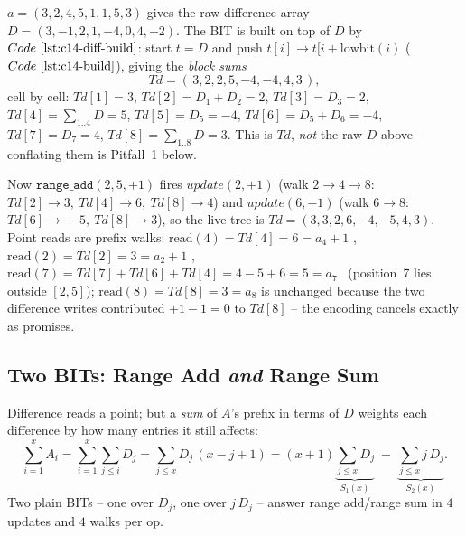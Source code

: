 \begin{tracebox}
\(a=(3,2,4,5,1,1,5,3)\) gives the raw difference array
\(D=(3,-1,2,1,-4,0,4,-2)\).  The BIT is built on top of \(D\) by
\(\coderef{c14-diff-build}\): start \(t=D\) and push \(t[i]\to t[i{+}\text{lowbit}(i)\)
(\(\coderef{c14-build}\)), giving the \emph{block sums}
\[
  Td=(\,3,2,2,5,-4,-4,4,3\,),
\]
cell by cell: \(Td[1]=3\), \(Td[2]=D_1{+}D_2=2\), \(Td[3]=D_3=2\),
\(Td[4]=\sum_{1..4}D=5\), \(Td[5]=D_5=-4\), \(Td[6]=D_5{+}D_6=-4\),
\(Td[7]=D_7=4\), \(Td[8]=\sum_{1..8}D=3\).  This is \(Td\), \emph{not} the
raw \(D\) above -- conflating them is Pitfall~1 below.

Now \(\texttt{range\_add}(2,5,+1)\) fires \(\mathit{update}(2,+1)\) (walk
\(2{\to}4{\to}8\): \(Td[2]\!{\to}\!3,\ Td[4]\!{\to}\!6,\ Td[8]\!{\to}\!4\)) and
\(\mathit{update}(6,-1)\) (walk \(6{\to}8\): \(Td[6]\!{\to}\!-5,\ Td[8]\!{\to}\!3\)),
so the live tree is \(Td=(3,3,2,6,-4,-5,4,3)\).  Point reads are prefix walks:
\(\text{read}(4)=Td[4]=6=a_4{+}1\) \checkmark,\quad
\(\text{read}(2)=Td[2]=3=a_2{+}1\) \checkmark,\quad
\(\text{read}(7)=Td[7]{+}Td[6]{+}Td[4]=4-5+6=5=a_7\) \checkmark\ (position~7
lies outside \([2,5]\)); \(\text{read}(8)=Td[8]=3=a_8\) is unchanged because
the two difference writes contributed \(+1-1=0\) to \(Td[8]\) -- the encoding
cancels exactly as  promises.
\end{tracebox}

\subsection{Two BITs: Range Add \emph{and} Range Sum}

Difference reads a point; but a \emph{sum} of \(A\)'s prefix in terms of
\(D\) weights each difference by how many entries it still affects:
\[
  \sum_{i=1}^{x} A_i
  = \sum_{i=1}^{x}\sum_{j\le i} D_j
  = \sum_{j\le x} D_j\,(x-j+1)
  = (x+1)\underbrace{\sum_{j\le x} D_j}_{S_1(x)}
    \;-\; \underbrace{\sum_{j\le x} j\,D_j}_{S_2(x)} .
\]
Two plain BITs -- one over \(D_j\), one over \(j\,D_j\) -- answer range
add/range sum in \(4\) updates and \(4\) walks per op.

